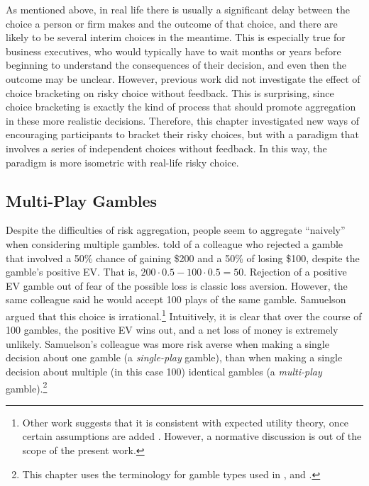 \documentclass[a4paper, nobind]{templates/ociamthesis}
\theoremstyle{definition}
\theoremstyle{definition}
\theoremstyle{definition}
\theoremstyle{definition}
\theoremstyle{remark}
\begin{document}
As mentioned above, in real life there is usually a significant delay between
the choice a person or firm makes and the outcome of that choice, and there are
likely to be several interim choices in the meantime. This is especially true
for business executives, who would typically have to wait months or years before
beginning to understand the consequences of their decision, and even then the
outcome may be unclear. However, previous work did not investigate the effect of
choice bracketing on risky choice without feedback. This is surprising, since
choice bracketing is exactly the kind of process that should promote aggregation
in these more realistic decisions. Therefore, this chapter investigated new ways
of encouraging participants to bracket their risky choices, but with a paradigm
that involves a series of independent choices without feedback. In this way, the
paradigm is more isometric with real-life risky choice.

\subsection{Multi-Play Gambles}

Despite the difficulties of risk aggregation, people seem to aggregate ``naively''
when considering multiple gambles. \textcite{samuelson1963} told of a colleague who
rejected a gamble that involved a 50\% chance of gaining \$200 and a 50\% of losing
\$100, despite the gamble's positive EV. That is, \(200 \cdot 0.5 - 100 \cdot 0.5 = 50\). Rejection of a positive EV gamble out of fear of the possible loss is
classic loss aversion. However, the same colleague said he would accept 100
plays of the same gamble. Samuelson argued that this choice is
irrational.\footnote{Other work suggests that it is consistent with expected utility
  theory, once certain assumptions are added \autocites[e.g.,][]{ross1999,aloysius2007}.
  However, a normative discussion is out of the scope of the present work.} Intuitively, it is clear that over the course of 100
gambles, the positive EV wins out, and a net loss of money is extremely
unlikely. Samuelson's colleague was more risk averse when making a single
decision about one gamble (a \emph{single-play} gamble), than when making a single
decision about multiple (in this case 100) identical gambles (a \emph{multi-play}
gamble).\footnote{This chapter uses the terminology for gamble types used in
  \textcite{bristow2011}, and \textcite{camilleri2013}.}
\end{document}
